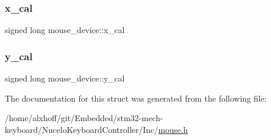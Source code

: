\mbox{\label{structmouse__device_a26d6bdcbf761da9f1a25b1306b9d5537}} 
\subsubsection{\texorpdfstring{x\+\_\+cal}{x\_cal}}
{\footnotesize\ttfamily signed long mouse\+\_\+device\+::x\+\_\+cal}

\mbox{\label{structmouse__device_a4cca0d6c7a390712d323549f2f33b4f5}} 
\subsubsection{\texorpdfstring{y\+\_\+cal}{y\_cal}}
{\footnotesize\ttfamily signed long mouse\+\_\+device\+::y\+\_\+cal}



The documentation for this struct was generated from the following file\+:\begin{DoxyCompactItemize}
\item 
/home/alxhoff/git/\+Embedded/stm32-\/mech-\/keyboard/\+Nucelo\+Keyboard\+Controller/\+Inc/\hyperlink{mouse_8h}{mouse.\+h}\end{DoxyCompactItemize}
